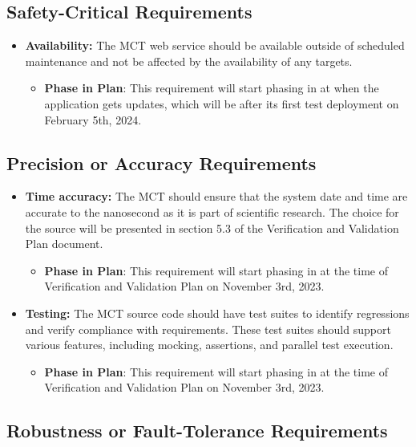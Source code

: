 \documentclass[12pt]{article}
\begin{document}
\subsection{Safety-Critical Requirements}

\begin{itemize}
    \item \textbf{Availability: }The MCT web service should be available outside of scheduled maintenance and not be affected by the availability of any targets.
    \begin{itemize}
        \item \textbf{Phase in Plan}: This requirement will start phasing in at when the application gets updates, which will be after its first test deployment on February 5th, 2024.
    \end{itemize}
\end{itemize}

\subsection{Precision or Accuracy Requirements}

\begin{itemize}
    \item \textbf{Time accuracy:} The MCT should ensure that the system date and time are accurate to the nanosecond as it is part of scientific research. The choice for the source will be presented in section 5.3 of the Verification and Validation Plan document.
    \begin{itemize}
        \item \textbf{Phase in Plan}: This requirement will start phasing in at the time of Verification and Validation Plan on November 3rd, 2023.
    \end{itemize}
    \item \textbf{Testing: }The MCT source code should have test suites to identify regressions and verify compliance with requirements. These test suites should support various features, including mocking, assertions, and parallel test execution.
    \begin{itemize}
        \item \textbf{Phase in Plan}: This requirement will start phasing in at the time of Verification and Validation Plan on November 3rd, 2023.
    \end{itemize}
\end{itemize}


\subsection{Robustness or Fault-Tolerance Requirements}
\end{document}
